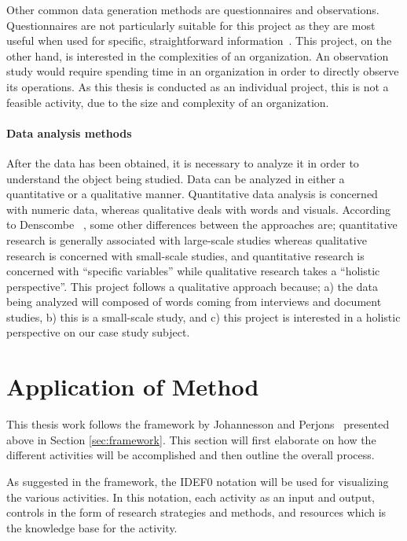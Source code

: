 Other common data generation methods are questionnaires and observations. Questionnaires are not particularly suitable for this project as they are most useful when used for specific, straightforward information~\cite{denscombe2010good}. This project, on the other hand, is interested in the complexities of an organization. An observation study would require spending time in an organization in order to directly observe its operations. As this thesis is conducted as an individual project, this is not a feasible activity, due to the size and complexity of an organization.

\paragraph*{Data analysis methods}

After the data has been obtained, it is necessary to analyze it in order to understand the object being studied. Data can be analyzed in either a quantitative or a qualitative manner. Quantitative data analysis is concerned with numeric data, whereas qualitative deals with words and visuals. According to Denscombe ~\cite{denscombe2010good}, some other differences between the approaches are; quantitative research is generally associated with large-scale studies whereas qualitative research is concerned with small-scale studies, and quantitative research is concerned with ``specific variables'' while qualitative research takes a ``holistic perspective''. This project follows a qualitative approach because; a) the data being analyzed will composed of words coming from interviews and document studies, b) this is a small-scale study, and c) this project is interested in a holistic perspective on our case study subject.

\section{Application of Method}

This thesis work follows the framework by Johannesson and Perjons~\cite[Ch. 4]{johannessonPerjons2012} presented above in Section \ref{sec:framework}. This section will first elaborate on how the different activities will be accomplished and then outline the overall process. 

As suggested in the framework, the IDEF0 notation will be used for visualizing the various activities. In this notation, each activity as an input and output, controls in the form of research strategies and methods, and resources which is the knowledge base for the activity.

